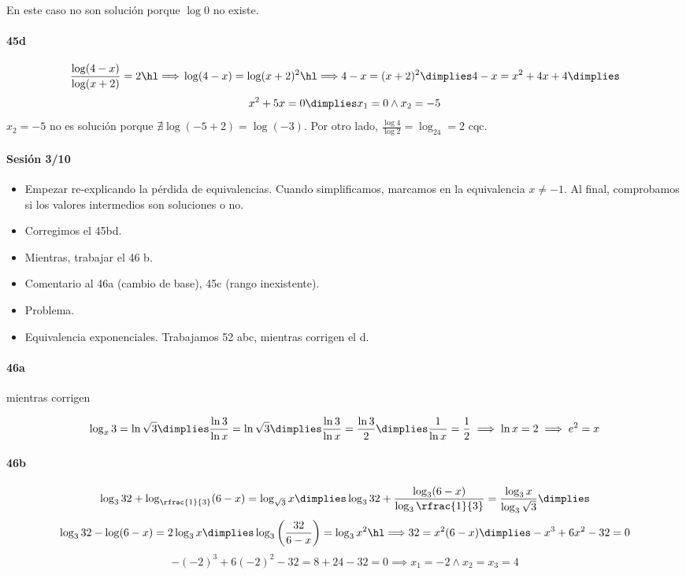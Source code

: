 En este caso no son solución porque $\log 0$ no existe.

\paragraph{45d}
\[
\frac{\log (4-x)}{\log(x+2)}=2 \cimplies \log(4-x) = \log(x+2)^2 \cimplies 4-x=(x+2)^2 \dimplies 4-x=x^2+4x+4 \dimplies
	\]
	\[ x^2+5x=0 \dimplies x_1=0 \wedge x_2=-5
\]
$x_2=-5$ no es solución porque $\nexists\log(-5+2)=\log(-3)$. Por otro lado, $\frac{\log4}{\log2} = \log_24=2$ cqc.

\paragraph{Sesión 3/10}
\begin{itemize}
	\item Empezar re-explicando la pérdida de equivalencias. Cuando simplificamos, marcamos en la equivalencia $x\neq-1$. Al final, comprobamos si los valores intermedios son soluciones o no.
	\item Corregimos el 45bd.
	\item Mientras, trabajar el 46 b.
	\item Comentario al 46a (cambio de base), 45c (rango inexistente).
	\item Problema.
	\item Equivalencia exponenciales. Trabajamos 52 abc, mientras corrigen el d.
\end{itemize}

\paragraph{46a} mientras corrigen

\[
	\log_x 3 = \ln \sqrt{3} \dimplies \frac{\ln3}{\ln x}=\ln\sqrt{3} \dimplies \frac{\ln3}{\ln x}=\frac{\ln3}{2} \dimplies \frac{1}{\ln x}=\frac{1}{2} \implies \ln x = 2 \implies e^2=x
\]

\paragraph{46b}
\[
	\log_332+\log_{\rfrac{1}{3}}(6-x) = \log_{\sqrt{3}}x \dimplies \log_332+\frac{\log_3(6-x)}{\log_3\rfrac{1}{3}} = \frac{\log_3x}{\log_3{\sqrt{3}}} \dimplies 
\]
\[
	\log_332-\log(6-x)=2\log_3x\dimplies \log_3\left(\frac{32}{6-x}\right)=\log_3x^2 \cimplies 32=x^2(6-x) \dimplies -x^3+6x^2-32 = 0
\]
\[
	-(-2)^3 + 6(-2)^2-32 = 8+24-32 = 0\implies x_1=-2 \wedge x_2=x_3=4
\]
 
